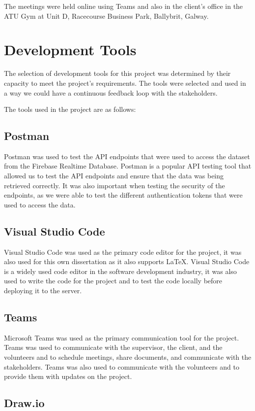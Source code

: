 The meetings were held online using Teams and also in the client's office in the ATU Gym at Unit D, Racecourse Business Park, Ballybrit, Galway. 

\section{Development Tools}
The selection of development tools for this project was determined by their capacity to meet the project's requirements.
The tools were selected and used in a way we could have a continuous feedback loop with the stakeholders.

The tools used in the project are as follows:

\subsection{Postman}
Postman was used to test the API endpoints that were used to access the dataset from the Firebase Realtime Database. Postman is a popular API testing tool
that allowed us to test the API endpoints and ensure that the data was being retrieved correctly. It was also important when testing the security of the endpoints, 
as we were able to test the different authentication tokens that were used to access the data.

\subsection{Visual Studio Code}
Visual Studio Code was used as the primary code editor for the project, it was also used for this own dissertation as it also supports \LaTeX. Visual Studio Code 
is a widely used code editor in the software development industry, it was also used to write the code for the project and to test the 
code locally before deploying it to the server.

\subsection{Teams}
Microsoft Teams was used as the primary communication tool for the project. Teams was used to communicate with the supervisor, the client, and the volunteers and to 
schedule meetings, share documents, and communicate with the stakeholders. Teams was also used to communicate with the volunteers and to provide them
with updates on the project. 

\subsection{Draw.io}

